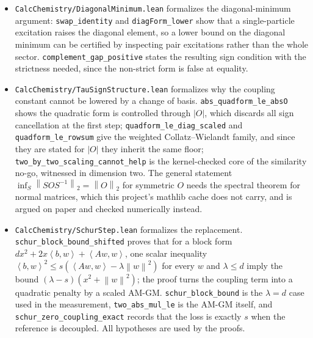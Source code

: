 \documentclass[11pt,a4paper]{article}
\theoremstyle{plain}
\theoremstyle{definition}
\theoremstyle{remark}
\newcommand{\norm}[1]{\left\lVert #1\right\rVert}
\newcommand{\abs}[1]{\left\lvert #1\right\rvert}
\newcommand{\ip}[2]{\left\langle #1,#2\right\rangle}
\providecommand{\path}[1]{\texttt{#1}}
\begin{document}
\begin{sloppypar}
\begin{itemize}
\path{complement_bound_tight_when_decoupled} shows the gap is exactly $\tau$ when
the coupling vanishes, and \path{complement_bound_improvement} records that
tightening $\tau$ buys precision one-for-one. What is \emph{not} formalized is the
hard part: no bound on $\tau$ is derived, and the measurements in
Section~\ref{sec:complexity} show that no change of basis can supply one.
\item \path{CalcChemistry/DiagonalMinimum.lean} formalizes the diagonal-minimum
argument: \path{swap_identity} and \path{diagForm_lower} show that a
single-particle excitation raises the diagonal element, so a lower bound on the
diagonal minimum can be certified by inspecting pair excitations rather than the
whole sector. \path{complement_gap_positive} states the resulting sign condition
with the strictness needed, since the non-strict form is false at equality.
\item \path{CalcChemistry/TauSignStructure.lean} formalizes why the coupling
constant cannot be lowered by a change of basis. \path{abs_quadform_le_absO}
shows the quadratic form is controlled through $\abs{O}$, which discards all sign
cancellation at the first step; \path{quadform_le_diag_scaled} and
\path{quadform_le_rowsum} give the weighted Collatz--Wielandt family, and since
they are stated for $\abs{O}$ they inherit the same floor;
\path{two_by_two_scaling_cannot_help} is the kernel-checked core of the
similarity no-go, witnessed in dimension two. The general statement
$\inf_S\norm{SOS^{-1}}_2=\norm{O}_2$ for symmetric $O$ needs the spectral theorem
for normal matrices, which this project's mathlib cache does not carry, and is
argued on paper and checked numerically instead.
\item \path{CalcChemistry/SchurStep.lean} formalizes the replacement.
\path{schur_block_bound_shifted} proves that for a block form
$d x^2+2x\ip{b}{w}+\ip{Aw}{w}$, one scalar inequality
$\ip{b}{w}^2\le s(\ip{Aw}{w}-\lambda\norm{w}^2)$ for every $w$ and $\lambda\le d$
imply the bound $(\lambda-s)(x^2+\norm{w}^2)$; the proof turns the coupling term
into a quadratic penalty by a scaled AM-GM. \path{schur_block_bound} is the
$\lambda=d$ case used in the measurement, \path{two_abs_mul_le} is the AM-GM
itself, and \path{schur_zero_coupling_exact} records that the loss is exactly
$s$ when the reference is decoupled. All hypotheses are used by the proofs.


\end{itemize}
\end{sloppypar}
\end{document}
